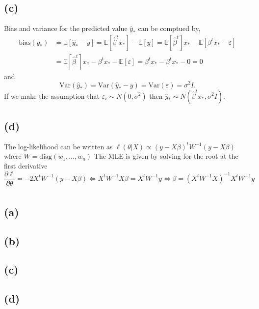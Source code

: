 \documentclass[10pt]{article}
\def\E{\mathbb{E}}
\def\Var{\text{Var}}
\begin{document}
\subsection*{(c)}
Bias and variance for the predicted value $\hat{y}_*$ can be comptued by,
\begin{align*}
    \text{bias}(\hat{y}_*) &= \E[\hat{y}_* - y] = \E[\hat{\beta}^t x_*] - \E[y] = \E[\hat{\beta}^t]x_* - \E[\beta^t x_* - \varepsilon] \\
    &= \E[\hat{\beta}^t]x_* - \beta^t x_* - \E[\varepsilon] = \beta^t x_* - \beta^t x_* - 0 = 0
\end{align*} and
\[\Var(\hat{y}_*) = \Var(\hat{y}_* - y) = \Var(\varepsilon) = \sigma^2 I.\]
If we make the assumption that $\varepsilon_i \sim N(0, \sigma^2)$ then $\hat{y}_* \sim N(\hat{\beta}^t x_*, \sigma^2 I).$

\subsection*{(d)}
The log-likelihood can be written as $\ell(\theta | X) \propto (y - X\beta)^t W^{-1} (y - X\beta)$
where $W = \text{diag}(w_1, \dotsc, w_n)$ The MLE is given by solving for the root at the first derivative
\[
    \frac{\partial \ell}{\partial \theta} = - 2 X^t W^{-1}(y - X\beta) \Leftrightarrow 
     X^tW^{-1}X\beta = X^t W^{-1}y \Leftrightarrow \beta = (X^t W^{-1} X)^{-1} X^t W^{-1} y
 \]


\section{}
\subsection*{(a)}
\subsection*{(b)}
\subsection*{(c)}
\subsection*{(d)}
\end{document}
